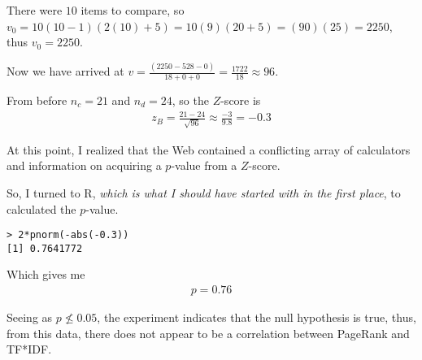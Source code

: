 \documentclass[letterpaper,11pt]{article}
\begin{document}
There were $10$ items to compare, so $v_0 = 10(10 - 1)(2(10) + 5) = 10(9)(20 + 5) = (90)(25) = 2250$, thus $v_0 = 2250$.

Now we have arrived at $v = \frac{(2250 - 528 - 0)}{18 + 0 + 0} = \frac{1722}{18} \approx 96$.

From before $n_c = 21$ and $n_d = 24$, so the $Z$-score is
\begin{align*}
z_B = \frac{21 - 24}{\sqrt{96}} \approx \frac{-3}{9.8} = -0.3
\end{align*}

At this point, I realized that the Web contained a conflicting array of calculators and information on acquiring a $p$-value from a $Z$-score.

So, I turned to R, \emph{which is what I should have started with in the first place}, to calculated the $p$-value\cite{ktRtut}.

\begin{lstlisting}[frame=single]
> 2*pnorm(-abs(-0.3))
[1] 0.7641772
\end{lstlisting}

Which gives me
\begin{align*}
p = 0.76
\end{align*}

Seeing as $p \not\le 0.05$, the experiment indicates that the null hypothesis is true\cite{pwikipedia}, thus, from this data, there does not appear to be a correlation between PageRank and TF*IDF.
\end{document}
